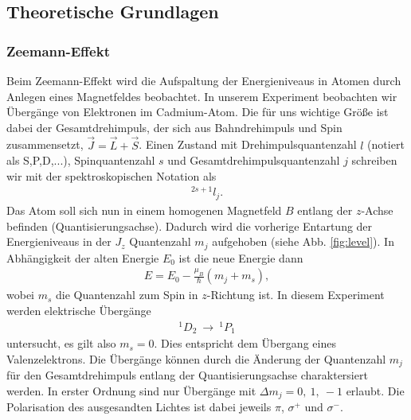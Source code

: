 \subsection{Theoretische Grundlagen}
\subsubsection{Zeemann-Effekt}
Beim Zeemann-Effekt wird die Aufspaltung der Energieniveaus in Atomen durch Anlegen eines Magnetfeldes beobachtet. In unserem Experiment beobachten wir Übergänge von Elektronen im Cadmium-Atom. Die für uns wichtige Größe ist dabei der Gesamtdrehimpuls, der sich aus Bahndrehimpuls und Spin zusammensetzt, $\vec{J}=\vec{L}+\vec{S}$. Einen Zustand mit Drehimpulsquantenzahl $l$ (notiert als S,P,D,...), Spinquantenzahl $s$ und Gesamtdrehimpulsquantenzahl $j$ schreiben wir mit der spektroskopischen Notation als
\begin{align*}
  ^{2s+1}l_j.
\end{align*}
Das Atom soll sich nun in einem homogenen Magnetfeld $B$ entlang der $z$-Achse befinden (Quantisierungsachse). Dadurch wird die vorherige Entartung der Energieniveaus in der $J_z$ Quantenzahl $m_j$ aufgehoben (siehe Abb. \ref{fig:level}). In Abhängigkeit der alten Energie $E_0$ ist die neue Energie dann
\begin{align*}
  E=E_0-\frac{\mu_B}{\hbar}\left( m_j+m_s\right),
\end{align*}
wobei $m_s$ die Quantenzahl zum Spin in $z$-Richtung ist.
In diesem Experiment werden elektrische Übergänge 
\begin{align*}
^1D_2 \ \rightarrow  \ ^1P_1 
\end{align*}
untersucht, es gilt also $m_s=0$. Dies entspricht dem Übergang eines Valenzelektrons. Die Übergänge können durch die Änderung der Quantenzahl $m_j$ für den Gesamtdrehimpuls entlang der Quantisierungsachse charaktersiert werden. In erster Ordnung sind nur Übergänge mit $\Delta m_j=0, \ 1, \ -1$ erlaubt. Die Polarisation des ausgesandten Lichtes ist dabei jeweils $\pi$, $\sigma ^+$ und $\sigma^-$.

